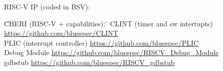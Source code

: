 \begin{frame}[fragile]
RISC-V IP (coded in BSV):
{\scriptsize
\begin{tabbing}
\hmmm \= CHERI (RISC-V + capabilities):  \hm \= \kill
      \> CLINT (timer and sw intertupts)     \> \href{https://github.com/bluespec/CLINT}
                                                     {https://github.com/bluespec/CLINT} \\
      \> PLIC (interrupt controller)         \> \href{https://github.com/bluespec/PLIC}
                                                     {https://github.com/bluespec/PLIC} \\
      \> Debug Module                        \> \href{https://github.com/bluespec/RISCV_Debug_Module}
                                                     {https://github.com/bluespec/RISCV\_Debug\_Module} \\
      \> gdbstub                             \> \href{https://github.com/bluespec/RISCV_gdbstub}
                                                     {https://github.com/bluespec/RISCV\_gdbstub}
\end{tabbing}}

\end{frame}






